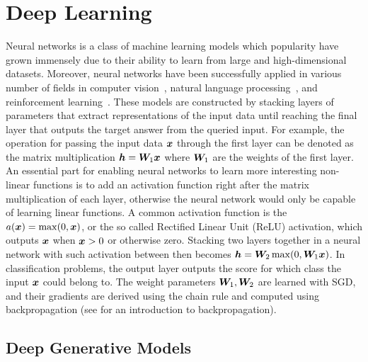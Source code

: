 \section{Deep Learning} 
\label{sec:deep_learning}

Neural networks is a class of machine learning models which popularity have grown immensely due to their ability to learn from large and high-dimensional datasets. Moreover, neural networks have been successfully applied in various number of fields in computer vision~\cite{he2016deep, krizhevsky2012imagenet}, natural language processing~\cite{devlin2018bert}, and reinforcement learning~\cite{mnih2015human, silver2016mastering}. These models are constructed by stacking layers of parameters that extract representations of the input data until reaching the final layer that outputs the target answer from the queried input. For example, the operation for passing the input data ${\bm{x}}$ through the first layer can be denoted as the matrix multiplication ${\bm{h}} = {\bm{W}}_1{\bm{x}}$ where ${\bm{W}}_1$ are the weights of the first layer. An essential part for enabling neural networks to learn more interesting non-linear functions is to add an activation function right after the matrix multiplication of each layer, otherwise the neural network would only be capable of learning linear functions. A common activation function is the $a({\bm{x}}) = \max(0, {\bm{x}})$, or the so called Rectified Linear Unit (ReLU) activation, which outputs ${\bm{x}}$ when ${\bm{x}} > 0$ or otherwise zero. Stacking two layers together in a neural network with such activation between then becomes ${\bm{h}} = {\bm{W}}_2\max(0,  {\bm{W}}_1{\bm{x}})$. In classification problems, the output layer outputs the score for which class the input ${\bm{x}}$ could belong to. The weight parameters ${\bm{W}}_1, {\bm{W}}_2$ are learned with SGD, and their gradients are derived using the chain rule and computed using backpropagation (see \cite{goodfellow2016deep} for an introduction to backpropagation).  

\subsection{Deep Generative Models}
\label{sec:deep_generative_models}

